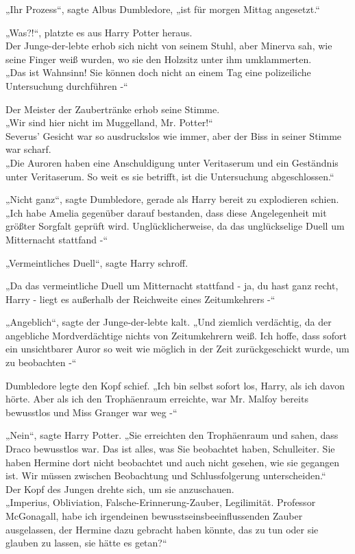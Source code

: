 {„Ihr Prozess“, sagte Albus Dumbledore, „ist für morgen Mittag angesetzt.“

„Was?!“, platzte es aus Harry Potter heraus.\\ Der Junge-der-lebte erhob sich nicht von seinem Stuhl, aber Minerva sah, wie seine Finger weiß wurden, wo sie den Holzsitz unter ihm umklammerten.\\ „Das ist Wahnsinn! Sie können doch nicht an einem Tag eine polizeiliche Untersuchung durchführen -“

Der Meister der Zaubertränke erhob seine Stimme.\\ „Wir sind hier nicht im Muggelland, Mr. Potter!“\\ Severus' Gesicht war so ausdruckslos wie immer, aber der Biss in seiner Stimme war scharf.\\ „Die Auroren haben eine Anschuldigung unter Veritaserum und ein Geständnis unter Veritaserum. So weit es sie betrifft, ist die Untersuchung abgeschlossen.“

„Nicht ganz“, sagte Dumbledore, gerade als Harry bereit zu explodieren schien. „Ich habe Amelia gegenüber darauf bestanden, dass diese Angelegenheit mit größter Sorgfalt geprüft wird. Unglücklicherweise, da das unglückselige Duell um Mitternacht stattfand -“

„Vermeintliches Duell“, sagte Harry schroff.

„Da das vermeintliche Duell um Mitternacht stattfand - ja, du hast ganz recht, Harry - liegt es außerhalb der Reichweite eines Zeitumkehrers -“

„Angeblich“, sagte der Junge-der-lebte kalt. „Und ziemlich verdächtig, da der angebliche Mordverdächtige nichts von Zeitumkehrern weiß. Ich hoffe, dass sofort ein unsichtbarer Auror so weit wie möglich in der Zeit zurückgeschickt wurde, um zu beobachten -“

Dumbledore legte den Kopf schief. „Ich bin selbst sofort los, Harry, als ich davon hörte. Aber als ich den Trophäenraum erreichte, war Mr. Malfoy bereits bewusstlos und Miss Granger war weg -“

„Nein“, sagte Harry Potter. „Sie erreichten den Trophäenraum und sahen, dass Draco bewusstlos war. Das ist alles, was Sie beobachtet haben, Schulleiter. Sie haben Hermine dort nicht beobachtet und auch nicht gesehen, wie sie gegangen ist. Wir müssen zwischen Beobachtung und Schlussfolgerung unterscheiden.“\\ Der Kopf des Jungen drehte sich, um sie anzuschauen.\\ „Imperius, Obliviation, Falsche-Erinnerung-Zauber, Legilimität. Professor McGonagall, habe ich irgendeinen bewusstseinsbeeinflussenden Zauber ausgelassen, der Hermine dazu gebracht haben könnte, das zu tun oder sie glauben zu lassen, sie hätte es getan?“

}
